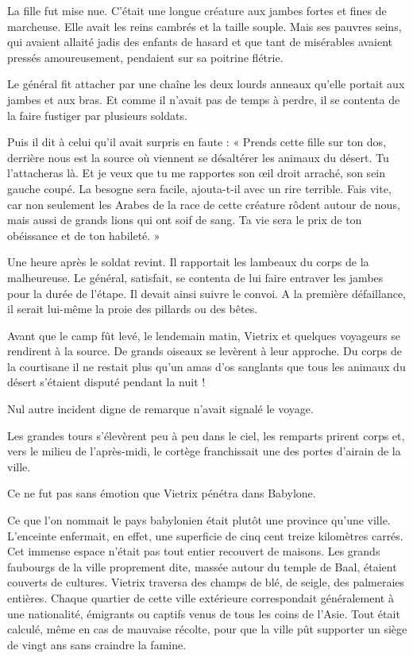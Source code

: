 \documentclass[a4paper, 11pt, oneside, polutonikogreek, french]{article}
\begin{document}
La fille fut mise nue. C'était une longue créature aux jambes fortes et fines de marcheuse. Elle avait les reins cambrés et la taille souple. Mais ses pauvres seins, qui avaient allaité jadis des enfants de hasard et que tant de misérables avaient pressés amoureusement, pendaient sur sa poitrine flétrie.

Le général fit attacher par une chaîne les deux lourds anneaux qu'elle portait aux jambes et aux bras. Et comme il n'avait pas de temps à perdre, il se contenta de la faire fustiger par plusieurs soldats.

Puis il dit à celui qu'il avait surpris en faute : « Prends cette fille sur ton dos, derrière nous est la source où viennent se désaltérer les animaux du désert. Tu l'attacheras là. Et je veux que tu me rapportes son œil droit arraché, son sein gauche coupé. La besogne sera facile, ajouta-t-il avec un rire terrible. Fais vite, car non seulement les Arabes de la race de cette créature rôdent autour de nous, mais aussi de grands lions qui ont soif de sang. Ta vie sera le prix de ton obéissance et de ton habileté. »

Une heure après le soldat revint. Il rapportait les lambeaux du corps de la malheureuse. Le général, satisfait, se contenta de lui faire entraver les jambes pour la durée de l'étape. Il devait ainsi suivre le convoi. A la première défaillance, il serait lui-même la proie des pillards ou des bêtes.

Avant que le camp fût levé, le lendemain matin, Vietrix et quelques voyageurs se rendirent à la source. De grands oiseaux se levèrent à leur approche. Du corps de la courtisane il ne restait plus qu'un amas d'os sanglants que tous les animaux du désert s'étaient disputé pendant la nuit !

Nul autre incident digne de remarque n'avait signalé le voyage.

\bigskip
\centerline{\EightStarTaper}
\centerline{\EightStarTaper\EightStarTaper}
\bigskip

Les grandes tours s'élevèrent peu à peu dans le ciel, les remparts prirent corps et, vers le milieu de l'après-midi, le cortège franchissait une des portes d'airain de la ville.

Ce ne fut pas sans émotion que Vietrix pénétra dans Babylone.

Ce que l'on nommait le pays babylonien était plutôt une province qu'une ville. L'enceinte enfermait, en effet, une superficie de cinq cent treize kilomètres carrés. Cet immense espace n'était pas tout entier recouvert de maisons. Les grands faubourgs de la ville proprement dite, massée autour du temple de Baal, étaient couverts de cultures. Vietrix traversa des champs de blé, de seigle, des palmeraies entières. Chaque quartier de cette ville extérieure correspondait généralement à une nationalité, émigrants ou captifs venus de tous les coins de l'Asie. Tout était calculé, même en cas de mauvaise récolte, pour que la ville pût supporter un siège de vingt ans sans craindre la famine.
\end{document}
